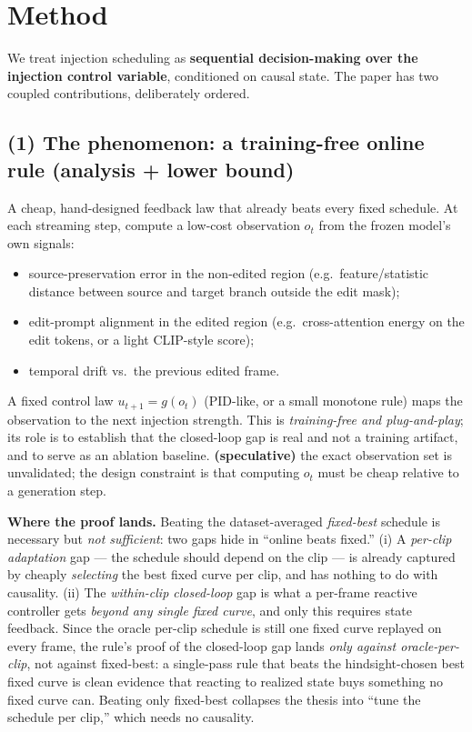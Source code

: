 \documentclass{article}
\begin{document}
\section{Method}

We treat injection scheduling as \textbf{sequential decision-making over the injection control
variable}, conditioned on causal state. The paper has two coupled contributions, deliberately
ordered.

\subsection*{(1) The phenomenon: a training-free online rule (analysis + lower bound)}

A cheap, hand-designed feedback law that already beats every fixed schedule. At each streaming
step, compute a low-cost observation $o_t$ from the frozen model's own signals:
\begin{itemize}
  \item source-preservation error in the non-edited region (e.g.\ feature/statistic distance
        between source and target branch outside the edit mask);
  \item edit-prompt alignment in the edited region (e.g.\ cross-attention energy on the edit
        tokens, or a light CLIP-style score);
  \item temporal drift vs.\ the previous edited frame.
\end{itemize}
A fixed control law $u_{t+1} = g(o_t)$ (PID-like, or a small monotone rule) maps the
observation to the next injection strength. This is \emph{training-free and plug-and-play};
its role is to establish that the closed-loop gap is real and not a training artifact, and to
serve as an ablation baseline. \textbf{(speculative)} the exact observation set is unvalidated;
the design constraint is that computing $o_t$ must be cheap relative to a generation step.

\textbf{Where the proof lands.} Beating the dataset-averaged \emph{fixed-best} schedule is
necessary but \emph{not sufficient}: two gaps hide in ``online beats fixed.'' (i) A
\emph{per-clip adaptation} gap --- the schedule should depend on the clip --- is already
captured by cheaply \emph{selecting} the best fixed curve per clip, and has nothing to do with
causality. (ii) The \emph{within-clip closed-loop} gap is what a per-frame reactive controller
gets \emph{beyond any single fixed curve}, and only this requires state feedback. Since the
oracle per-clip schedule is still one fixed curve replayed on every frame, the rule's proof of
the closed-loop gap lands \emph{only against oracle-per-clip}, not against fixed-best: a
single-pass rule that beats the hindsight-chosen best fixed curve is clean evidence that
reacting to realized state buys something no fixed curve can. Beating only fixed-best collapses
the thesis into ``tune the schedule per clip,'' which needs no causality.
\end{document}
